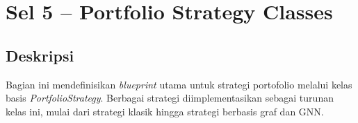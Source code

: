 \documentclass[12pt,a4paper]{article}
\begin{document}
\section{Sel 5 -- Portfolio Strategy Classes}

\subsection{Deskripsi}
Bagian ini mendefinisikan \textit{blueprint} utama untuk strategi portofolio melalui kelas basis \textit{PortfolioStrategy}. Berbagai strategi diimplementasikan sebagai turunan kelas ini, mulai dari strategi klasik hingga strategi berbasis graf dan GNN.
\end{document}
